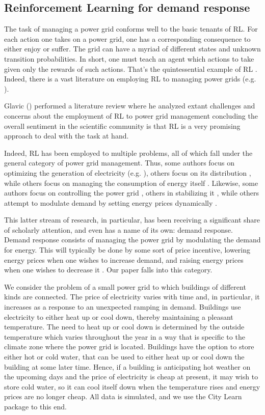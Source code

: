 \documentclass{article}
\begin{document}
\subsection{Reinforcement Learning for demand response}

The task of managing a power grid conforms well to the basic tenants of RL. For each action one takes on a power grid, one has a corresponding consequence to either enjoy or suffer. The grid can have a myriad of different states and unknown transition probabilities. In short, one must teach an agent which actions to take given only the rewards of such actions. That's the quintessential example of RL \cite{Lambert2020}. Indeed, there is a vast literature on employing RL to managing power grids (e.g. \cite{Ademoye2012, Hadidi2013, Glavic2017, Mocanu2019}).

Glavic (\cite{Glavic2017}) performed a literature review where he analyzed extant challenges and concerns about the employment of RL to power grid management concluding the overall sentiment in the scientific community is that RL is a very promising approach to deal with the task at hand.

Indeed, RL has been employed to multiple problems, all of which fall under the general category of power grid management. Thus, some authors focus on optimizing the generation of electricity (e.g. \cite{Wang2016}), others focus on its distribution \cite{Gemine2017}, while others focus on managing the consumption of energy itself \cite{Xu2020, Mocanu2019, Si2021}. Likewise, some authors focus on controlling the power grid \cite{Yousefian2016}, others in stabilizing it \cite{Hadidi2013}, while others attempt to modulate demand by setting energy prices dynamically \cite{Tsui2012}.

This latter stream of research, in particular, has been receiving a significant share of scholarly attention, and even has a name of its own: demand response. Demand response consists of managing the power grid by modulating the demand for energy. This will typically be done by some sort of price incentive, lowering energy prices when one wishes to increase demand, and raising energy prices when one wishes to decrease it \cite{Christensen2020, Kurte2020}. Our paper falls into this category. 

We consider the problem of a small power grid to which buildings of different kinds are connected. The price of electricity varies with time and, in particular, it increases as a response to an unexpected ramping in demand. Buildings use electricity to either heat up or cool down, thereby maintaining a pleasant temperature. The need to heat up or cool down is determined by the outside temperature which varies throughout the year in a way that is specific to the climate zone where the power grid is located. Buildings have the option to store either hot or cold water, that can be used to either heat up or cool down the building at some later time. Hence, if a building is anticipating hot weather on the upcoming days and the price of electricity is cheap at present, it may wish to store cold water, so it can cool itself down when the temperature rises and energy prices are no longer cheap. All data is simulated, and we use the City Learn package to this end.
\end{document}
